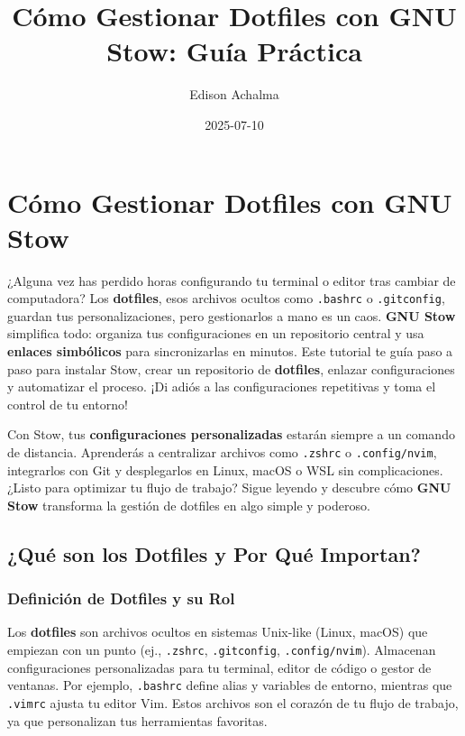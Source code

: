 \documentclass[
  jou,
  floatsintext,
  longtable,
  a4paper,
  nolmodern,
  notxfonts,
  notimes,
  colorlinks=true,linkcolor=blue,citecolor=blue,urlcolor=blue]{apa7}
\title{Cómo Gestionar Dotfiles con GNU Stow: Guía Práctica}
\author{Edison Achalma}
\affiliation{
{Escuela Profesional de Economía, Universidad Nacional de San Cristóbal
de Huamanga}}
\date{2025-07-10}
\begin{document}
\maketitle

\hypertarget{toc}{}
\tableofcontents
\newpage
\section[Introduction]{Cómo Gestionar Dotfiles con GNU Stow}

\setcounter{secnumdepth}{5}

\setlength\LTleft{0pt}


¿Alguna vez has perdido horas configurando tu terminal o editor tras
cambiar de computadora? Los \textbf{dotfiles}, esos archivos ocultos
como \texttt{.bashrc} o \texttt{.gitconfig}, guardan tus
personalizaciones, pero gestionarlos a mano es un caos. \textbf{GNU
Stow} simplifica todo: organiza tus configuraciones en un repositorio
central y usa \textbf{enlaces simbólicos} para sincronizarlas en
minutos. Este tutorial te guía paso a paso para instalar Stow, crear un
repositorio de \textbf{dotfiles}, enlazar configuraciones y automatizar
el proceso. ¡Di adiós a las configuraciones repetitivas y toma el
control de tu entorno!

Con Stow, tus \textbf{configuraciones personalizadas} estarán siempre a
un comando de distancia. Aprenderás a centralizar archivos como
\texttt{.zshrc} o \texttt{.config/nvim}, integrarlos con Git y
desplegarlos en Linux, macOS o WSL sin complicaciones. ¿Listo para
optimizar tu flujo de trabajo? Sigue leyendo y descubre cómo \textbf{GNU
Stow} transforma la gestión de dotfiles en algo simple y poderoso.

\subsection{¿Qué son los Dotfiles y Por Qué
Importan?}\label{quuxe9-son-los-dotfiles-y-por-quuxe9-importan}

\subsubsection{Definición de Dotfiles y su
Rol}\label{definiciuxf3n-de-dotfiles-y-su-rol}

Los \textbf{dotfiles} son archivos ocultos en sistemas Unix-like (Linux,
macOS) que empiezan con un punto (ej., \texttt{.zshrc},
\texttt{.gitconfig}, \texttt{.config/nvim}). Almacenan configuraciones
personalizadas para tu terminal, editor de código o gestor de ventanas.
Por ejemplo, \texttt{.bashrc} define alias y variables de entorno,
mientras que \texttt{.vimrc} ajusta tu editor Vim. Estos archivos son el
corazón de tu flujo de trabajo, ya que personalizan tus herramientas
favoritas.
\end{document}

